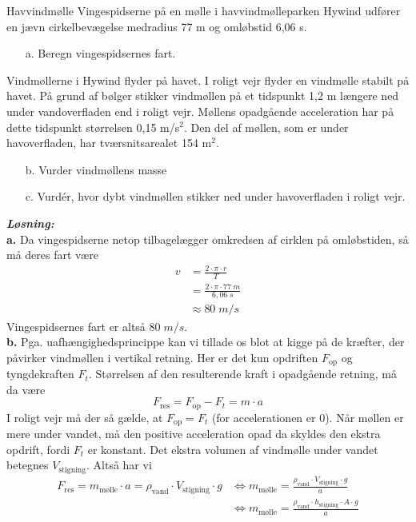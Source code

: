 \documentclass{report}
\newcommand{\sol}{\setlength{\parindent}{0cm}\textbf{\textit{Løsning:}}\setlength{\parindent}{1cm}}
\begin{document}
\begin{question}{Havvindmølle}{}
  Vingespidserne på en mølle i havvindmølleparken Hywind udfører en jævn cirkelbevægelse medradius 77 m og omløbstid 6,06 s.
\begin{itemize}
  \item[a.] Beregn vingespidsernes fart.
\end{itemize}
Vindmøllerne i Hywind flyder på havet. I roligt vejr flyder en vindmølle stabilt på havet. På grund af bølger stikker vindmøllen på et tidspunkt 1,2 m længere ned under vandoverfladen end i roligt vejr. Møllens opadgående acceleration har på dette tidspunkt størrelsen 0,15 m/s$^2.$
Den del af møllen, som er under havoverfladen, har tværsnitsarealet 154 m$^{2}.$
\begin{itemize}
  \item[b.] Vurder vindmøllens masse
  \item[c.] Vurdér, hvor dybt vindmøllen stikker ned under havoverfladen i roligt vejr.
\end{itemize}
\end{question}
\sol \\
\textbf{a.}
Da vingespidserne netop tilbagelægger omkredsen af cirklen på omløbstiden, så må deres fart være 
\begin{equation*}
\begin{split}
  v&=\frac{2 \cdot \pi \cdot r}{T}\\
  &=\frac{2 \cdot \pi \cdot 77 \;\unit{m} }{6,06 \;\unit{s} }\\
  &\approx 80 \;\unit{m/s}
\end{split}
\end{equation*}
Vingespidsernes fart er altså $80 \;\unit{m/s} $.\\[1ex]
\textbf{b.}
Pga. uafhængighedsprincippe kan vi tillade os blot at kigge på de kræfter, der påvirker vindmøllen i vertikal retning.
Her er det kun opdriften $F_{\text{op} }$ og tyngdekraften $F_t$.
Størrelsen af den resulterende kraft i opadgående retning, må da være 
\[
F _{\text{res} }=F _{\text{op} }-F_t=m \cdot a
\] 
I roligt vejr må der så gælde, at $F _{\text{op} }=F_t$ (for accelerationen er $0$).
Når møllen er mere under vandet, må den positive acceleration opad da skyldes den ekstra opdrift, fordi $F_t$ er konstant. 
Det ekstra volumen af vindmølle under vandet betegnes $V_{\text{stigning} }$.
Altså har vi 
\begin{equation*}
\begin{split}
  F _{\text{res} }= m _{\text{mølle} } \cdot a = \rho_{\text{vand} } \cdot V_{\text{stigning} } \cdot g &\iff m_{\text{mølle} }=\frac{\rho _{\text{vand} }\cdot V _{\text{stigning}} \cdot g}{a}\\
  &\iff m_{\text{mølle} }=\frac{\rho _{\text{vand} }\cdot h _{\text{stigning} } \cdot A \cdot g}{a}
\end{split}
\end{equation*}
\end{document}
